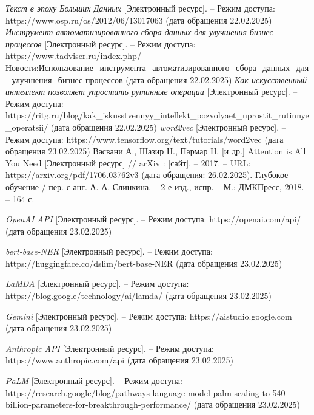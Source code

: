 \begin{thebibliography}{}
	\textit{Текст в эпоху Больших Данных} [Электронный ресурс]. --
	Режим доступа: https://www.osp.ru/os/2012/06/13017063 (дата обращения 22.02.2025)
	\textit{Инструмент автоматизированного сбора данных для улучшения бизнес-процессов} [Электронный ресурс]. --
	Режим доступа: https://www.tadviser.ru/index.php/Новости:Использование\_инструмента\_автоматизированного\_сбора\_данных\_для\_улучшения\_бизнес-процессов (дата обращения 22.02.2025)
	\textit{Как искусственный интеллект позволяет упростить рутинные операции} [Электронный ресурс]. --
	Режим доступа: https://ritg.ru/blog/kak\_iskusstvennyy\_intellekt\_pozvolyaet\_uprostit\_rutinnye\_operatsii/ (дата обращения 22.02.2025)
	\textit{word2vec} [Электронный ресурс]. --
	Режим доступа: https://www.tensorflow.org/text/tutorials/word2vec (дата обращения 23.02.2025)
	Васвани А., Шазир Н., Пармар Н. [и др.] Attention is All You Need [Электронный ресурс] // arXiv : [сайт]. – 2017. – URL: https://arxiv.org/pdf/1706.03762v3 (дата обращения: 26.02.2025).
	Глубокое обучение / пер. с анг. А. А. Слинкина. – 2-е изд., испр. – М.: ДМКПресс, 2018. – 164 с.

	\textit{OpenAI API} [Электронный ресурс]. --
	Режим доступа: https://openai.com/api/ (дата обращения 23.02.2025)

	\textit{bert-base-NER} [Электронный ресурс]. --
	Режим доступа: https://huggingface.co/dslim/bert-base-NER (дата обращения 23.02.2025)

	\textit{LaMDA} [Электронный ресурс]. --
	Режим доступа: https://blog.google/technology/ai/lamda/ (дата обращения 23.02.2025)

	\textit{Gemini} [Электронный ресурс]. --
	Режим доступа: https://aistudio.google.com (дата обращения 23.02.2025)

	\textit{Anthropic API} [Электронный ресурс]. --
	Режим доступа: https://www.anthropic.com/api (дата обращения 23.02.2025)

	\textit{PaLM} [Электронный ресурс]. --
	Режим доступа: https://research.google/blog/pathways-language-model-palm-scaling-to-540-billion-parameters-for-breakthrough-performance/ (дата обращения 23.02.2025)


\end{thebibliography}
